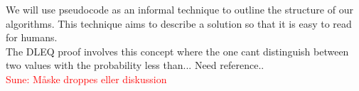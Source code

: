  We will use pseudocode as an informal technique to outline the structure of our algorithms. This technique aims to describe a solution so that it is easy to read for humans.\\

The DLEQ proof involves this concept where the one cant distinguish between two values with the probability less than... Need reference..\\
\textcolor{red}{Sune: Måske droppes eller diskussion}




